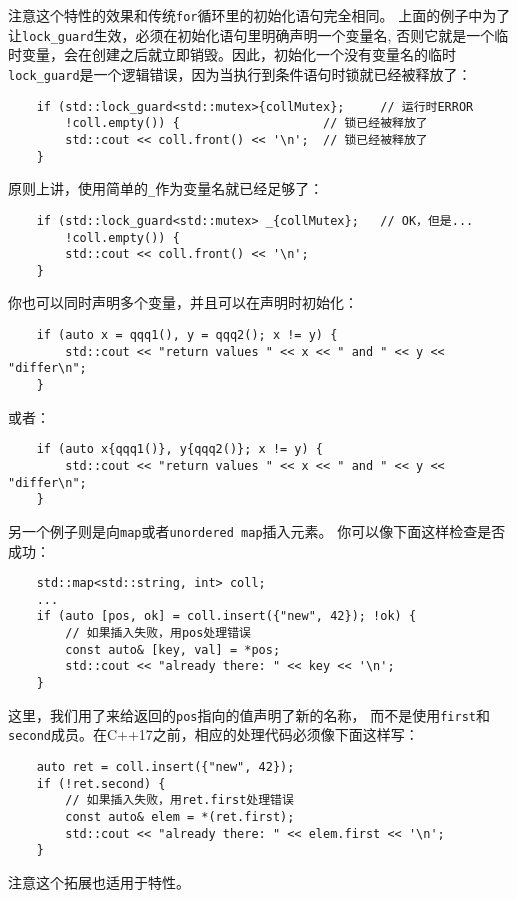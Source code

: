 注意这个特性的效果和传统\texttt{for}循环里的初始化语句完全相同。
上面的例子中为了让\texttt{lock\_guard}生效，必须在初始化语句里明确声明一个变量名,
否则它就是一个临时变量，会在创建之后就立即销毁。因此，初始化一个没有变量名的临时
\texttt{lock\_guard}是一个逻辑错误，因为当执行到条件语句时锁就已经被释放了：
\begin{lstlisting}
    if (std::lock_guard<std::mutex>{collMutex};     // 运行时ERROR
        !coll.empty()) {                    // 锁已经被释放了
        std::cout << coll.front() << '\n';  // 锁已经被释放了
    }
\end{lstlisting}
原则上讲，使用简单的\texttt{\_}作为变量名就已经足够了：
\begin{lstlisting}
    if (std::lock_guard<std::mutex> _{collMutex};   // OK，但是...
        !coll.empty()) {
        std::cout << coll.front() << '\n';
    }
\end{lstlisting}
你也可以同时声明多个变量，并且可以在声明时初始化：
\begin{lstlisting}
    if (auto x = qqq1(), y = qqq2(); x != y) {
        std::cout << "return values " << x << " and " << y << "differ\n";
    }
\end{lstlisting}
或者：
\begin{lstlisting}
    if (auto x{qqq1()}, y{qqq2()}; x != y) {
        std::cout << "return values " << x << " and " << y << "differ\n";
    }
\end{lstlisting}
另一个例子则是向\texttt{map}或者\texttt{unordered map}插入元素。
你可以像下面这样检查是否成功：
\begin{lstlisting}
    std::map<std::string, int> coll;
    ...
    if (auto [pos, ok] = coll.insert({"new", 42}); !ok) {
        // 如果插入失败，用pos处理错误
        const auto& [key, val] = *pos;
        std::cout << "already there: " << key << '\n';
    }
\end{lstlisting}
这里，我们用了来给返回的\texttt{pos}指向的值声明了新的名称，
而不是使用\texttt{first}和\texttt{second}成员。在C++17之前，相应的处理代码必须像下面这样写：
\begin{lstlisting}
    auto ret = coll.insert({"new", 42});
    if (!ret.second) {
        // 如果插入失败，用ret.first处理错误
        const auto& elem = *(ret.first);
        std::cout << "already there: " << elem.first << '\n';
    }
\end{lstlisting}
注意这个拓展也适用于特性。

